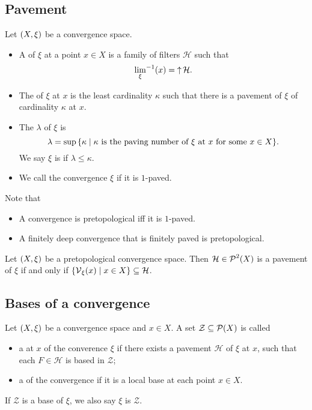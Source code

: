 \subsection{Pavement}
\begin{definition}
Let $\left( X,\xi \right)$ be a convergence space.
\begin{itemize}
\item A  of $\xi$ at a point $x\in X$ is a family of filters $\mathcal{H}$ such that
\[ {\lim_\xi}^{-1}(x) = \operatorname{\uparrow}\mathcal{H}. \]
\item The  of $\xi$ at $x$ is the least cardinality $\kappa$ such that there is a pavement of $\xi$ of cardinality $\kappa$ at $x$.
\item The  $\lambda$ of $\xi$ is
\[ \lambda = \sup\setbuilder{\kappa}{\text{$\kappa$ is the paving number of $\xi$ at $x$ for some $x\in X$}}. \]
We say $\xi$ is  if $\lambda \leq \kappa$.
\item We call the convergence $\xi$  if it is $1$-paved.
\end{itemize}
\end{definition}
Note that
\begin{itemize}
\item A convergence is pretopological iff it is $1$-paved.
\item A finitely deep convergence that is finitely paved is pretopological.
\end{itemize}

\begin{lemma}
Let $\left( X,\xi \right)$ be a pretopological convergence space. Then $\mathcal{H}\in\operatorname{\mathcal{P}}^2(X)$ is a pavement of $\xi$ \textup{if and only if} $\setbuilder{\vicinity_\xi(x)}{x\in X} \subseteq \mathcal{H}$.
\end{lemma}

\subsection{Bases of a convergence}
\begin{definition}
Let $\left( X,\xi \right)$ be a convergence space and $x\in X$. A set $\mathcal{Z}\subseteq \operatorname{\mathcal{P}}(X)$ is called
\begin{itemize}
\item a  at $x$ of the converence $\xi$ if there exists a pavement $\mathcal{H}$ of $\xi$ at $x$, such that each $F\in\mathcal{H}$ is based in $\mathcal{Z}$;
\item a  of the convergence if it is a local base at each point $x\in X$.
\end{itemize}
If $\mathcal{Z}$ is a base of $\xi$, we also say $\xi$ is  $\mathcal{Z}$.
\end{definition}


